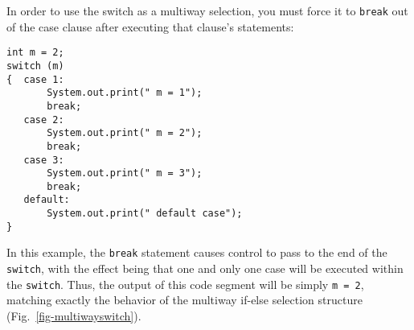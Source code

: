 In order to use the switch as a multiway selection, you must force it
to {\tt break} out of the case clause after executing
that clause's statements:

\begin{jjjlisting}
\begin{lstlisting}
int m = 2;
switch (m)
{  case 1:
       System.out.print(" m = 1");
       break;
   case 2:
       System.out.print(" m = 2");
       break;
   case 3:
       System.out.print(" m = 3");
       break;
   default:
       System.out.print(" default case");
}
\end{lstlisting}
\end{jjjlisting}


\noindent In this example, the {\tt break} statement causes control to
pass to the end of the {\tt switch}, with the effect being that one
and only one case will be executed within the {\tt switch}. Thus, the
output of this code segment will be simply \mbox{\tt m = 2}, matching
exactly the behavior of the multiway if-else selection structure
(Fig.~\ref{fig-multiwayswitch}).

\begin{figure}[hbt]
\end{figure}






